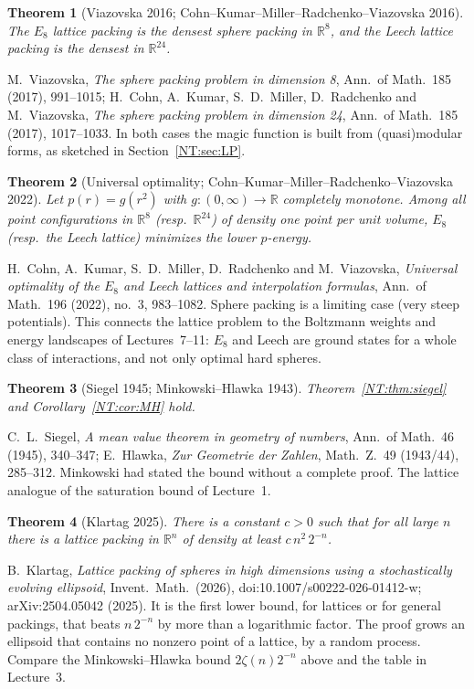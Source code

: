 \documentclass[11pt,openany]{book}
\theoremstyle{plain}
\newtheorem{theorem}{Theorem}[chapter]
\theoremstyle{definition}
\theoremstyle{remark}
\newcommand{\R}{\mathbb{R}}
\begin{document}
\begin{theorem}[Viazovska 2016; Cohn--Kumar--Miller--Radchenko--Viazovska 2016]\label{NT:gal:viazovska}
The $E_8$ lattice packing is the densest sphere packing in $\R^8$, and the Leech lattice packing is the
densest in $\R^{24}$.
\end{theorem}
M.~Viazovska, \emph{The sphere packing problem in dimension 8}, Ann.\ of Math.\ 185 (2017), 991--1015;
H.~Cohn, A.~Kumar, S.~D.~Miller, D.~Radchenko and M.~Viazovska, \emph{The sphere packing problem in dimension
24}, Ann.\ of Math.\ 185 (2017), 1017--1033. In both cases the magic function is built from (quasi)modular
forms, as sketched in Section~\ref{NT:sec:LP}.

\begin{theorem}[Universal optimality; Cohn--Kumar--Miller--Radchenko--Viazovska 2022]\label{NT:gal:universal}
Let $p(r)=g(r^2)$ with $g\colon(0,\infty)\to\R$ completely monotone. Among all point configurations in $\R^8$
(resp.\ $\R^{24}$) of density one point per unit volume, $E_8$ (resp.\ the Leech lattice) minimizes the
lower $p$-energy.
\end{theorem}
H.~Cohn, A.~Kumar, S.~D.~Miller, D.~Radchenko and M.~Viazovska, \emph{Universal optimality of the $E_8$ and
Leech lattices and interpolation formulas}, Ann.\ of Math.\ 196 (2022), no.~3, 983--1082. Sphere packing is
a limiting case (very steep potentials). This connects the lattice problem to the Boltzmann weights and
energy landscapes of Lectures~7--11: $E_8$ and Leech are ground states for a whole class of interactions,
and not only optimal hard spheres.

\begin{theorem}[Siegel 1945; Minkowski--Hlawka 1943]\label{NT:gal:siegel}
Theorem~\ref{NT:thm:siegel} and Corollary~\ref{NT:cor:MH} hold.
\end{theorem}
C.~L.~Siegel, \emph{A mean value theorem in geometry of numbers}, Ann.\ of Math.\ 46 (1945), 340--347;
E.~Hlawka, \emph{Zur Geometrie der Zahlen}, Math.\ Z.\ 49 (1943/44), 285--312. Minkowski had stated the bound
without a complete proof. The lattice analogue of the saturation bound of Lecture~1.

\begin{theorem}[Klartag 2025]\label{NT:gal:klartag}
There is a constant $c>0$ such that for all large $n$ there is a lattice packing in $\R^n$ of density at least
$c\,n^2\,2^{-n}$.
\end{theorem}
B.~Klartag, \emph{Lattice packing of spheres in high dimensions using a stochastically evolving ellipsoid},
Invent.\ Math.\ (2026), doi:10.1007/s00222-026-01412-w; arXiv:2504.05042 (2025). It is the first lower bound, for lattices or for general packings, that beats
$n\,2^{-n}$ by more than a logarithmic factor. The proof grows an ellipsoid that contains no nonzero point
of a lattice, by a random process. Compare the Minkowski--Hlawka bound
$2\zeta(n)2^{-n}$ above and the table in Lecture~3.
\end{document}
